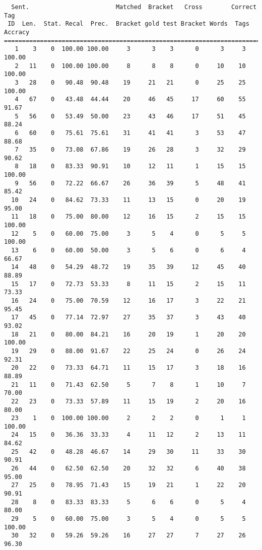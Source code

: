 \scriptsize
\begin{verbatim}
  Sent.                        Matched  Bracket   Cross        Correct Tag
 ID  Len.  Stat. Recal  Prec.  Bracket gold test Bracket Words  Tags Accracy
============================================================================
   1    3    0  100.00 100.00     3      3    3      0      3     3   100.00
   2   11    0  100.00 100.00     8      8    8      0     10    10   100.00
   3   28    0   90.48  90.48    19     21   21      0     25    25   100.00
   4   67    0   43.48  44.44    20     46   45     17     60    55    91.67
   5   56    0   53.49  50.00    23     43   46     17     51    45    88.24
   6   60    0   75.61  75.61    31     41   41      3     53    47    88.68
   7   35    0   73.08  67.86    19     26   28      3     32    29    90.62
   8   18    0   83.33  90.91    10     12   11      1     15    15   100.00
   9   56    0   72.22  66.67    26     36   39      5     48    41    85.42
  10   24    0   84.62  73.33    11     13   15      0     20    19    95.00
  11   18    0   75.00  80.00    12     16   15      2     15    15   100.00
  12    5    0   60.00  75.00     3      5    4      0      5     5   100.00
  13    6    0   60.00  50.00     3      5    6      0      6     4    66.67
  14   48    0   54.29  48.72    19     35   39     12     45    40    88.89
  15   17    0   72.73  53.33     8     11   15      2     15    11    73.33
  16   24    0   75.00  70.59    12     16   17      3     22    21    95.45
  17   45    0   77.14  72.97    27     35   37      3     43    40    93.02
  18   21    0   80.00  84.21    16     20   19      1     20    20   100.00
  19   29    0   88.00  91.67    22     25   24      0     26    24    92.31
  20   22    0   73.33  64.71    11     15   17      3     18    16    88.89
  21   11    0   71.43  62.50     5      7    8      1     10     7    70.00
  22   23    0   73.33  57.89    11     15   19      2     20    16    80.00
  23    1    0  100.00 100.00     2      2    2      0      1     1   100.00
  24   15    0   36.36  33.33     4     11   12      2     13    11    84.62
  25   42    0   48.28  46.67    14     29   30     11     33    30    90.91
  26   44    0   62.50  62.50    20     32   32      6     40    38    95.00
  27   25    0   78.95  71.43    15     19   21      1     22    20    90.91
  28    8    0   83.33  83.33     5      6    6      0      5     4    80.00
  29    5    0   60.00  75.00     3      5    4      0      5     5   100.00
  30   32    0   59.26  59.26    16     27   27      7     27    26    96.30

\end{verbatim}
